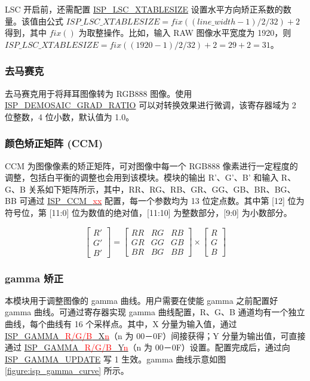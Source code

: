 \documentclass[main\_\_CN.tex]{subfiles}
\begin{document}
LSC 开启前，还需配置 \hyperref[fielddesc:ISPLSCXTABLESIZE]{ISP\_LSC\_XTABLESIZE} 设置水平方向矫正系数的数量。该值由公式 $ISP\_LSC\_XTABLESIZE = fix((line\_width -1)/2/32) + 2$ 得到，其中 $fix()$ 为取整操作。比如，输入 RAW 图像水平宽度为 1920，则 $ISP\_LSC\_XTABLESIZE = fix((1920-1)/2/32)+2 = 29+2 = 31$。


\subsubsection{去马赛克}
\label{sec:isp_demosaic}
去马赛克用于将拜耳图像转为 RGB888 图像。使用 \hyperref[fielddesc:ISPDEMOSAICGRADRATIO]{ISP\_DEMOSAIC\_GRAD\_RATIO} 可以对转换效果进行微调，该寄存器域为 2 位整数，4 位小数，默认值为 1.0。


\subsubsection{颜色矫正矩阵 (CCM)}
\label{sec:isp_ccm}
CCM 为图像像素的矫正矩阵，可对图像中每一个 RGB888 像素进行一定程度的调整，包括白平衡的调整也会用到该模块。模块的输出 R'、G'、B' 和输入 R、G、B 关系如下矩阵所示，其中，RR、RG、RB、GR、GG、GB、BR、BG、BB 可通过 \hyperref[fielddesc:ISPCCMRR]{ISP\_CCM\_\textcolor{red}{xx}} 配置，每一个参数均为 13 位定点数。其中第 [12] 位为符号位，第 [11:0] 位为数值的绝对值，[11:10] 为整数部分，[9:0] 为小数部分。

\begin{equation}
    \left[\begin{array}{c}
        R' \\
        G' \\
        B'
    \end{array}\right] = \left[\begin{array}{ccc}
        RR & RG & RB \\
        GR & GG & GB \\
        BR & BG & BB
    \end{array}\right]\times\left[\begin{array}{c}
        R \\
        G \\
        B
    \end{array}\right]
\end{equation}


\subsubsection{gamma 矫正}
\label{sec:isp_gamma}
本模块用于调整图像的 gamma 曲线。用户需要在使能 gamma 之前配置好 gamma 曲线。可通过寄存器实现 gamma 曲线配置，R、G、B 通道均有一个独立曲线，每个曲线有 16 个采样点。其中，X 分量为输入值，通过 \hyperref[fielddesc:ISPGAMMARX00]{ISP\_GAMMA\_\textcolor{red}{R/G/B}\_X\textcolor{red}{n}}（n 为 00－0F）间接获得；Y 分量为输出值，可直接通过 \hyperref[fielddesc:ISPGAMMARY00]{ISP\_GAMMA\_\textcolor{red}{R/G/B}\_Y\textcolor{red}{n}}（n 为 00－0F）设置。配置完成后，通过向 \hyperref[fielddesc:ISPGAMMAUPDATE]{ISP\_GAMMA\_UPDATE} 写 1 生效。gamma 曲线示意如图 \ref{figure:isp_gamma_curve} 所示。
\end{document}
